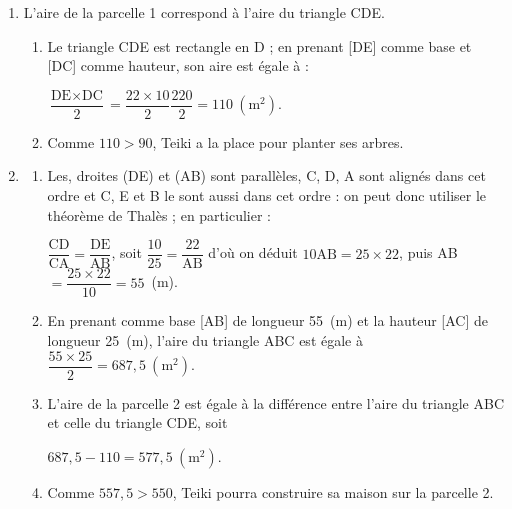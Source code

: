 \begin{enumerate}
\item L'aire de la parcelle 1 correspond à l'aire du triangle CDE.
	\begin{enumerate}
		\item %
Le triangle CDE est rectangle en D ; en prenant [DE] comme base et [DC] comme hauteur, son aire est égale à :

$\dfrac{\text{DE} \times \text{DC}}{2} = \dfrac{22 \times 10}{2} \dfrac{220}{2} = 110~\left(\text{m}^2\right)$.
		\item %

Comme $110 > 90$, Teiki a la place pour planter ses arbres.

	\end{enumerate}
\item %
	\begin{enumerate}
		\item %
		Les, droites (DE) et (AB) sont parallèles, C, D, A sont alignés dans cet ordre et C, E et B le sont aussi dans cet ordre : on peut donc utiliser le théorème de Thalès ; en particulier :
		
$\dfrac{\text{CD}}{\text{CA}} = \dfrac{\text{DE}}{\text{AB}}$, soit $\dfrac{10}{25} = \dfrac{\text{22}}{\text{AB}}$ d'où on déduit $10\text{AB} = 25 \times 22$, puis AB $ = \dfrac{25 \times 22}{10} = 55$~(m).
		\item %
		En prenant comme base [AB] de longueur 55~(m) et la hauteur [AC] de longueur 25~(m), l'aire du triangle ABC est égale à $\dfrac{55 \times 25}{2} = 687,5~\left(\text{m}^2\right)$.
		\item %

L'aire de la parcelle 2 est égale à la différence entre l'aire du triangle ABC et celle du triangle CDE, soit

$687,5 - 110 = 577,5~\left(\text{m}^2\right)$.
		\item %


Comme $557,5 > 550$, Teiki pourra construire sa maison sur la parcelle 2.
	\end{enumerate}
\end{enumerate}

